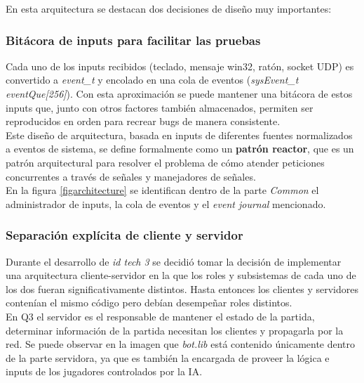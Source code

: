\documentclass[a4paper,12pt]{report}
\begin{document}
	\newpage
	
	En esta arquitectura se destacan dos decisiones de diseño muy importantes:
	
	\subsubsection{Bitácora de inputs para facilitar las pruebas}
	
	Cada uno de los inputs recibidos (teclado, mensaje win32, ratón, socket UDP) es convertido a \textit{event\_t} y encolado en una cola de eventos (\textit{sysEvent\_t eventQue[256]}). Con esta aproximación se puede mantener una bitácora de estos inputs que, junto con otros factores también almacenados, permiten ser reproducidos en orden para recrear bugs de manera consistente. \cite{johncplan}\\
    
    Este diseño de arquitectura, basada en inputs de diferentes fuentes normalizados a eventos de sistema, se define formalmente como un \textbf{patrón reactor}, que es un patrón arquitectural para resolver el problema de cómo atender peticiones concurrentes a través de señales y manejadores de señales.\\
	
	En la figura \ref{figarchitecture} se identifican dentro de la parte \textit{Common} el administrador de inputs, la cola de eventos y el \textit{event journal} mencionado.
	
	\subsubsection{Separación explícita de cliente y servidor}
	
	Durante el desarrollo de \textit{id tech 3} se decidió tomar la decisión de implementar una arquitectura cliente-servidor en la que los roles y subsistemas de cada uno de los dos fueran significativamente distintos. Hasta entonces los clientes y servidores contenían el mismo código pero debían desempeñar roles distintos.\\
	
	En Q3 el servidor es el responsable de mantener el estado de la partida, determinar información de la partida necesitan los clientes y propagarla por la red. Se puede observar en la imagen que \textit{bot.lib} está contenido únicamente dentro de la parte servidora, ya que es también la encargada de proveer la lógica e inputs de los jugadores controlados por la IA.\\
	
\end{document}

